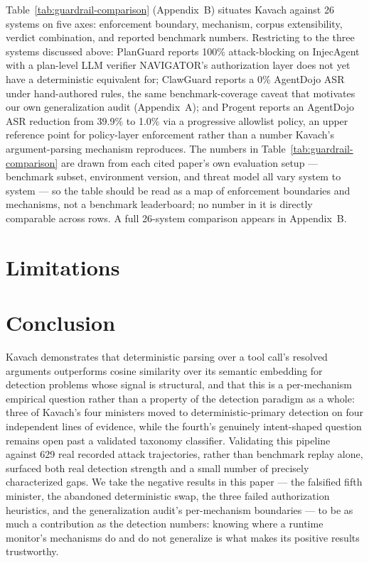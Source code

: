 \documentclass[sigconf,anonymous,review]{acmart}
\begin{document}
Table~\ref{tab:guardrail-comparison} (Appendix~B) situates Kavach against 26
systems on five axes: enforcement boundary, mechanism, corpus extensibility,
verdict combination, and reported benchmark numbers. Restricting to the three
systems discussed above: PlanGuard reports 100\% attack-blocking on
InjecAgent with a plan-level LLM verifier NAVIGATOR's authorization layer
does not yet have a deterministic equivalent for; ClawGuard reports a 0\%
AgentDojo ASR under hand-authored rules, the same benchmark-coverage caveat
that motivates our own generalization audit (Appendix~A); and Progent
reports an AgentDojo ASR reduction from 39.9\% to 1.0\% via a progressive
allowlist policy, an upper reference point for policy-layer enforcement
rather than a number Kavach's argument-parsing mechanism reproduces. The
numbers in Table~\ref{tab:guardrail-comparison} are drawn from each cited
paper's own evaluation setup --- benchmark subset, environment version, and
threat model all vary system to system --- so the table should be read as a
map of enforcement boundaries and mechanisms, not a benchmark leaderboard;
no number in it is directly comparable across rows. A full 26-system
comparison appears in Appendix~B.

\section{Limitations}
\label{sec:limitations}


\section{Conclusion}
\label{sec:conclusion}
Kavach demonstrates that deterministic parsing over a tool call's resolved
arguments outperforms cosine similarity over its semantic embedding for
detection problems whose signal is structural, and that this is a
per-mechanism empirical question rather than a property of the detection
paradigm as a whole: three of Kavach's four ministers moved to
deterministic-primary detection on four independent lines of evidence, while
the fourth's genuinely intent-shaped question remains open past a validated
taxonomy classifier. Validating this pipeline against 629 real recorded
attack trajectories, rather than benchmark replay alone, surfaced both real
detection strength and a small number of precisely characterized gaps. We take the negative results in this paper --- the falsified
fifth minister, the abandoned deterministic swap, the three failed
authorization heuristics, and the generalization audit's per-mechanism
boundaries --- to be as much a contribution as the detection numbers: knowing
where a runtime monitor's mechanisms do and do not generalize is what makes
its positive results trustworthy.
\end{document}
